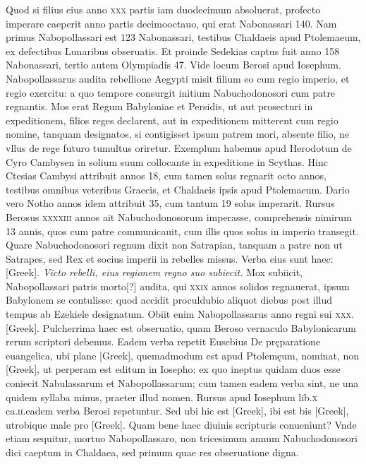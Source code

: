 Quod si filius eius anno \textsc{xxx} partis iam duodecimum
absoluerat, profecto imperare caeperit anno partis decimooctauo,
qui erat Nabonassari 140.
Nam primus Nabopollassari est 123 Nabonassari,
testibus Chaldaeis apud Ptolemaeum, ex defectibus Lunaribus
obseruatis.
Et proinde Sedekias captus fuit anno 158 Nabonassari,
tertio autem Olympiadis 47.
Vide locum Berosi apud Iosephum.
Nabopollassarus audita rebellione Aegypti misit filium eo
cum regio imperio, et regio exercitu: a quo tempore consurgit initium
Nabuchodonosori cum patre regnantis.
Mos erat Regum Babyloniae
et Persidis, ut aut prosecturi in expeditionem, filios reges declarent,
aut in expeditionem mitterent cum regio nomine, tanquam
designatos, si contigisset ipsum patrem mori, absente filio, ne
vllus de rege futuro tumultus oriretur.
Exemplum habemus apud
Herodotum de Cyro Cambysen in solium suum collocante in expeditione
in Scythas.
Hinc Ctesias Cambysi attribuit annos 18,
cum tamen solus regnarit octo annos, testibus omnibus veteribus
Graecis, et Chaldaeis ipsis apud Ptolemaeum.
Dario vero Notho annos
idem attribuit 35, cum tantum 19 solus imperarit.
Rursus Berosus
\textsc{xxxxiii} annos ait Nabuchodonosorum imperasse, comprehensis
nimirum 13 annis, quos cum patre communicauit, cum
illis quos solus in imperio transegit.
Quare Nabuchodonosori regnum
dixit non Satrapian, tanquam a patre non ut Satrapes, sed Rex
et socius imperii in rebelles missus.
Verba eius sunt haec: \textgreek{[Greek]}.
\textit{Victo rebelli, eius regionem regno suo subiecit.}
Mox subiicit, Nabopollassari patris morto[?]
audita, qui \textsc{xxix} annos solidos regnauerat, ipsum Babylonem se
contulisse: quod accidit proculdubio aliquot diebus post illud tempus
ab Ezekiele designatum.
Obiit enim Nabopollassarus anno regni
sui \textsc{xxx}.
\textgreek{[Greek]}.
Pulcherrima haec est obseruatio, quam Beroso vernaculo
Babylonicarum rerum scriptori debemus.
Eadem verba repetit Eusebius
De pręparatione euangelica, ubi plane \textgreek{[Greek]}, quemadmodum
est apud Ptolemęum, nominat, non \textgreek{[Greek]}, ut perperam
est editum in Iosepho: ex quo ineptus quidam duos esse coniecit
Nabulassarum et Nabopollassarum; cum tamen eadem verba sint, ne
una quidem syllaba minus, praeter illud nomen.
Rursus apud Iosephum
lib.\textsc{x} ca.\textsc{ii}.eadem verba Berosi repetuntur.
Sed ubi hic est \textgreek{[Greek]},
ibi est bis \textgreek{[Greek]}, utrobique male pro \textgreek{[Greek]}.
Quam bene haec diuinis scripturis conueniunt?
{}
Vnde etiam sequitur, mortuo Nabopollassaro, non tricesimum annum Nabuchodonosori
dici caeptum in Chaldaea, sed primum quae res obseruatione
digna.

